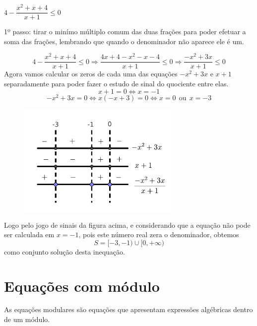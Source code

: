 \begin{exem}
  $4 - \dfrac{x^2+x+4}{x+1} \leq 0$
   \vskip0.3cm

  1º passo: tirar o minímo múltiplo comum das duas frações para poder efetuar a soma das frações, lembrando que quando o denominador não aparece ele é um.

  \[4 - \frac{x^2+x+4}{x+1} \leq 0 \Rightarrow
    \frac{4x+4-x^2-x-4}{x+1} \leq 0 \Rightarrow
    \frac{-x^2 + 3x}{x+1} \leq 0
  \]
  Agora vamos calcular os zeros de cada uma das equações $-x^2 + 3x$ e $x+1$ separadamente para poder fazer o estudo de sinal do quociente entre elas.
\begin{equation}
x+1=0 \Leftrightarrow x= -1
\end{equation}
\begin{equation}
-x^2 + 3x= 0 \Leftrightarrow x(-x+3)=0 \Leftrightarrow x=0 \ \ \text{ou} \ \ x=-3
\end{equation}
   \begin{figure}[H]
 \centering
 \includegraphics[width=8cm]{./cap_equacoes/figs/sinais}
 \end{figure}

 Logo pelo jogo de sinais da figura acima, e considerando que a equação não pode ser calculada em $x= -1$, pois este número real zera o denominador, obtemos
\begin{equation}
S= [-3, -1) \cup [0, +\infty)
\end{equation}
 como conjunto solução desta inequação.

 \end{exem}


 \section{Equações com módulo}

   \vskip0.3cm
 \colorbox{azul}{
 \begin{minipage}{0.9\linewidth}
 \begin{center}
  As equações modulares são equações que apresentam expressões algébricas dentro de um módulo.
 \end{center}
 \end{minipage}}
 \vskip0.3cm

